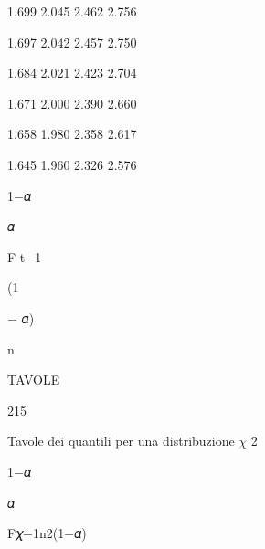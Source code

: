 \documentclass[a4paper,portrait,12pt]{article}
\begin{document}
1.699 2.045 2.462 2.756


1.697 2.042 2.457 2.750


1.684 2.021 2.423 2.704


1.671 2.000 2.390 2.660


1.658 1.980 2.358 2.617


1.645 1.960 2.326 2.576





\begin{flushleft}
1$-$𝛼
\end{flushleft}


\begin{flushleft}
𝛼
\end{flushleft}


\begin{flushleft}
F t$-$1
\end{flushleft}


(1


\begin{flushleft}
$-$ 𝛼)
\end{flushleft}


\begin{flushleft}
n
\end{flushleft}





\begin{flushleft}
\newpage
TAVOLE
\end{flushleft}





215





\begin{flushleft}
Tavole dei quantili per una distribuzione $\chi$ 2
\end{flushleft}


\begin{flushleft}
1$-$𝛼
\end{flushleft}





\begin{flushleft}
𝛼
\end{flushleft}





\begin{flushleft}
F𝜒$-$1n2(1$-$𝛼)
\end{flushleft}
\end{document}
